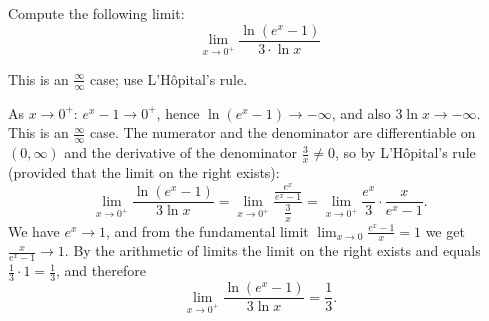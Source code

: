 
\begin{question}
Compute the following limit:
\[ \lim_{x\to0^+}\frac{\ln(e^x-1)}{3\cdot\ln x} \]
\end{question}

\begin{hint}
This is an $\frac{\infty}{\infty}$ case; use L'Hôpital's rule.
\end{hint}

\begin{solution}
As $x\to0^+$: $e^x-1\to0^+$, hence $\ln(e^x-1)\to-\infty$, and also $3\ln x\to-\infty$. This is an $\frac{\infty}{\infty}$ case. The numerator and the denominator are differentiable on $(0,\infty)$ and the derivative of the denominator $\frac3x\neq0$, so by L'Hôpital's rule (provided that the limit on the right exists):
\[ \lim_{x\to0^+}\frac{\ln(e^x-1)}{3\ln x}=\lim_{x\to0^+}\frac{\frac{e^x}{e^x-1}}{\frac3x}=\lim_{x\to0^+}\frac{e^x}{3}\cdot\frac{x}{e^x-1}. \]
We have $e^x\to1$, and from the fundamental limit $\lim_{x\to0}\frac{e^x-1}{x}=1$ we get $\frac{x}{e^x-1}\to1$. By the arithmetic of limits the limit on the right exists and equals $\frac13\cdot1=\frac13$, and therefore
\[ \lim_{x\to0^+}\frac{\ln(e^x-1)}{3\ln x}=\boxed{\frac13}. \]
\end{solution}
